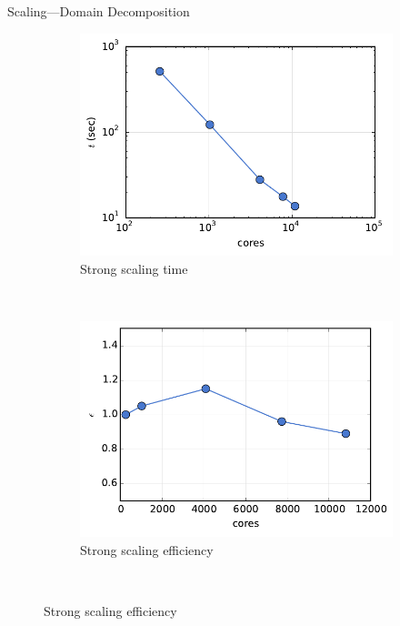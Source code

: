 \documentclass{beamer}
\begin{document}

\begin{frame}{Scaling---Domain Decomposition}

  \begin{figure}
    \centering
    \begin{subfigure}{0.35\textwidth}
      \centering
      \includegraphics[width=\textwidth]{strong_dd_time}
      \caption{Strong scaling time}
    \end{subfigure}
    ~
    \begin{subfigure}{0.35\textwidth}
      \centering
      \includegraphics[width=\textwidth]{strong_dd_eff}
      \caption{Strong scaling efficiency}
    \end{subfigure}\\

\end{figure}
\end{frame}
\end{document}

